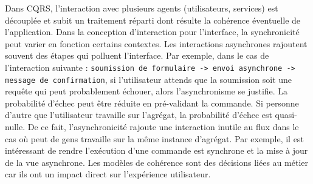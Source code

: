 Dans \gls{CQRS}, l'interaction avec plusieurs agents (utilisateurs, services) est 
découplée et subit un traitement réparti 
dont résulte la cohérence éventuelle de l'application. 
Dans la conception d'interaction pour l'interface, la synchronicité peut varier en 
fonction certains contextes. 
Les interactions asynchrones rajoutent souvent des étapes qui polluent l'interface.  
Par exemple, dans le cas de l'interaction suivante : \texttt{soumission de formulaire -> envoi 
asynchrone -> 
message de confirmation}, si l'utilisateur attends que la soumission soit une 
requête qui peut probablement échouer, alors l'asynchronisme se justifie. La probabilité 
d'échec peut être réduite en pré-validant la commande. Si personne d'autre que 
l'utilisateur travaille sur l'agrégat, la probabilité d'échec est quasi-nulle. De ce fait, 
l'asynchronicité rajoute une interaction inutile au flux dans le cas où peut de gens 
travaille sur la même instance d'agrégat.
Par exemple, il est intéressant de rendre l'exécution d'une 
commande est synchrone et la mise à jour de la vue asynchrone. Les modèles de 
cohérence sont des décisions liées au métier car ils ont un impact direct sur 
l'expérience utilisateur. 





%
%



